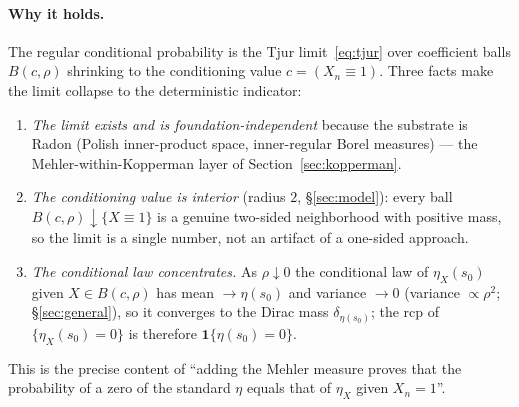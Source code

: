 \documentclass[11pt,a4paper]{article}
\theoremstyle{definition}
\newcommand{\etaX}{\eta_X}
\begin{document}
\paragraph{Why it holds.} The regular conditional probability is the Tjur
limit~\eqref{eq:tjur} over coefficient balls \(B(c,\rho)\) shrinking to the conditioning
value \(c=(X_n\equiv1)\). Three facts make the limit collapse to the deterministic indicator:
\begin{enumerate}
  \item \emph{The limit exists and is foundation-independent} because the substrate is
        Radon (Polish inner-product space, inner-regular Borel measures) --- the
        Mehler-within-Kopperman layer of Section~\ref{sec:kopperman}.
  \item \emph{The conditioning value is interior} (radius \(2\), \S\ref{sec:model}): every
        ball \(B(c,\rho)\downarrow\{X\equiv1\}\) is a genuine two-sided neighborhood with
        positive mass, so the limit is a single number, not an artifact of a one-sided
        approach.
  \item \emph{The conditional law concentrates.} As \(\rho\downarrow0\) the conditional law
        of \(\etaX(s_0)\) given \(X\in B(c,\rho)\) has mean \(\to\eta(s_0)\) and variance
        \(\to0\) (variance \(\propto\rho^2\); \S\ref{sec:general}), so it converges to the
        Dirac mass \(\delta_{\eta(s_0)}\); the rcp of \(\{\etaX(s_0)=0\}\) is therefore
        \(\mathbf{1}\{\eta(s_0)=0\}\).
\end{enumerate}
This is the precise content of ``adding the Mehler measure proves that the probability of
a zero of the standard \(\eta\) equals that of \(\etaX\) given \(X_n=1\)''.
\end{document}
